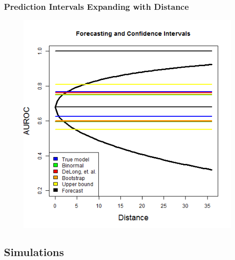 \documentclass{beamer}
\begin{document}
\begin{frame}
\frametitle{Prediction Intervals Expanding with Distance}

\vspace*{-0.25cm}
\begin{figure}
    \includegraphics[scale =  0.4 ]{Figs/Forecast_int_1.png}
\end{figure}

\end{frame}




\subsection{Simulations}


\end{document}
